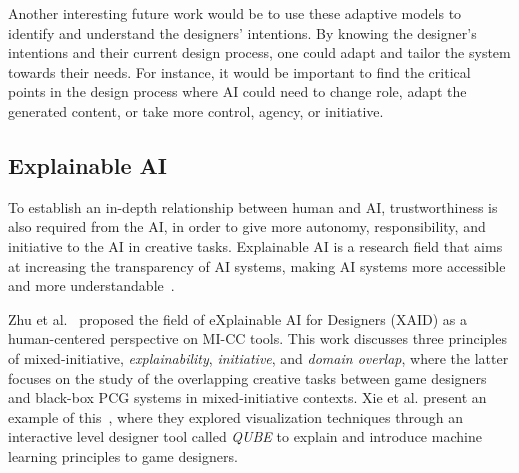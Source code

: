Another interesting future work would be to use these adaptive models to identify and understand the designers' intentions. By knowing the designer's intentions and their current design process, one could adapt and tailor the system towards their needs. For instance, it would be important to find the critical points in the design process where AI could need to change role, adapt the generated content, or take more control, agency, or initiative.


\subsection{Explainable AI}

To establish an in-depth relationship between human and AI, trustworthiness is also required from the AI, in order to give more autonomy, responsibility, and initiative to the AI in creative tasks. Explainable AI is a research field that aims at increasing the transparency of AI systems, making AI systems more accessible and more understandable~\cite{adadi_peeking_2018,doshi-velez_considerations_2018}.

Zhu et al.~\cite{zhu_explainable_2018} proposed the field of eXplainable AI for Designers (XAID) as a human-centered perspective on MI-CC tools. This work discusses three principles of mixed-initiative, \emph{explainability}, \emph{initiative}, and \emph{domain overlap}, where the latter focuses on the study of the overlapping creative tasks between game designers and black-box PCG systems in mixed-initiative contexts. Xie et al. present an example of this~\cite{xie_interactive_2019}, where they explored visualization techniques through an interactive level designer tool called \textit{QUBE} to explain and introduce machine learning principles to game designers.



